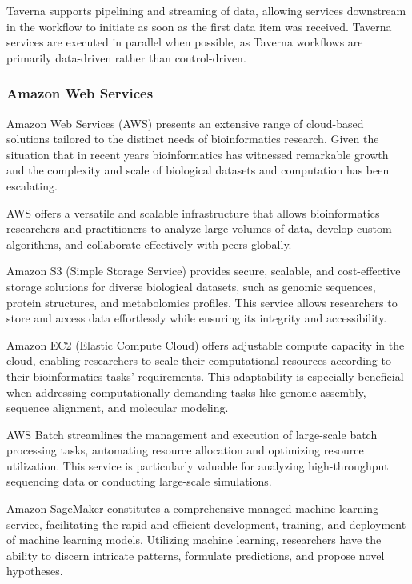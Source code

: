             Taverna supports pipelining and streaming of data, allowing services downstream in the workflow to initiate as soon as the first data item was received. Taverna services are executed in parallel when possible, as Taverna workflows are primarily data-driven rather than control-driven.

        \subsubsection{Amazon Web Services}
            Amazon Web Services (AWS) presents an extensive range of cloud-based solutions tailored to the distinct needs of bioinformatics research. Given the situation that in recent years bioinformatics has witnessed remarkable growth and the complexity and scale of biological datasets and computation has been escalating.
            
            AWS offers a versatile and scalable infrastructure that allows bioinformatics researchers and practitioners to analyze large volumes of data, develop custom algorithms, and collaborate effectively with peers globally. 
            
            Amazon S3 (Simple Storage Service) provides secure, scalable, and cost-effective storage solutions for diverse biological datasets, such as genomic sequences, protein structures, and metabolomics profiles. This service allows researchers to store and access data effortlessly while ensuring its integrity and accessibility.
            
            Amazon EC2 (Elastic Compute Cloud) offers adjustable compute capacity in the cloud, enabling researchers to scale their computational resources according to their bioinformatics tasks' requirements. This adaptability is especially beneficial when addressing computationally demanding tasks like genome assembly, sequence alignment, and molecular modeling.
            
            AWS Batch streamlines the management and execution of large-scale batch processing tasks, automating resource allocation and optimizing resource utilization. This service is particularly valuable for analyzing high-throughput sequencing data or conducting large-scale simulations.
            
            Amazon SageMaker constitutes a comprehensive managed machine learning service, facilitating the rapid and efficient development, training, and deployment of machine learning models. Utilizing machine learning, researchers have the ability to discern intricate patterns, formulate predictions, and propose novel hypotheses.
            
